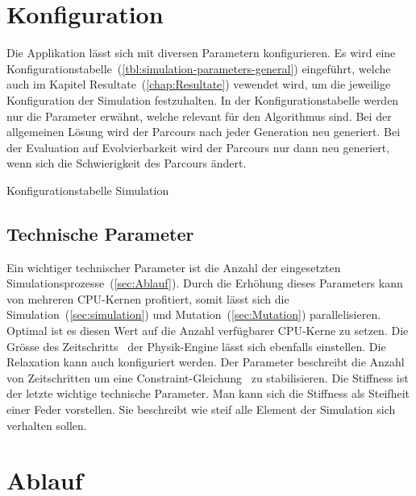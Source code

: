   \section{Konfiguration\label{sec:Konfiguration}}

    Die Applikation lässt sich mit diversen Parametern konfigurieren.
    Es wird eine Konfigurationstabelle~(\vref{tbl:simulation-parameters-general}) eingeführt,
    welche auch im Kapitel Resultate~(\vref{chap:Resultate}) vewendet wird,
    um die jeweilige Konfiguration der Simulation festzuhalten. In der Konfigurationstabelle werden nur die Parameter erwähnt,
    welche relevant für den Algorithmus sind. Bei der allgemeinen Lösung wird der Parcours
    nach jeder Generation neu generiert. Bei der Evaluation auf Evolvierbarkeit
    wird der Parcours nur dann neu generiert, wenn sich die Schwierigkeit des Parcours ändert.

    \begin{table}[H]
      
      \caption{Konfigurationstabelle Simulation\label{tbl:simulation-parameters-general}}
    \end{table}

    \subsection{Technische Parameter\label{sub:techParams}}
      Ein wichtiger technischer Parameter ist die Anzahl der eingesetzten Simulationsprozesse~(\vref{sec:Ablauf}).
      Durch die Erhöhung dieses Parameters kann von mehreren CPU-Kernen profitiert, somit lässt sich die Simulation~(\vref{sec:simulation}) und Mutation~(\vref{sec:Mutation}) parallelisieren.
      Optimal ist es diesen Wert auf die Anzahl verfügbarer CPU-Kerne zu setzen.
      Die Grösse des Zeitschritts~\cite{bullet:steppingTheWorld} der Physik-Engine lässt sich ebenfalls einstellen.
      Die Relaxation kann auch konfiguriert werden. Der Parameter beschreibt die Anzahl von Zeitschritten um eine Constraint-Gleichung~\cite{gamedev:constraints} zu stabilisieren.
      Die Stiffness ist der letzte wichtige technische Parameter. Man kann sich die Stiffness als Steifheit einer Feder vorstellen.
      Sie beschreibt wie steif alle Element der Simulation sich verhalten sollen.


  \section{Ablauf\label{sec:Ablauf}}

